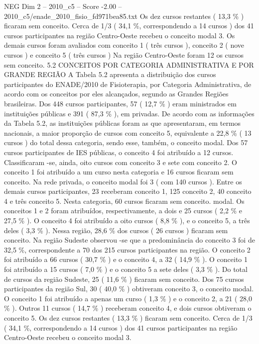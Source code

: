 \begin{textsample}{NEG Dim 2 – 2010\_c5 – Score -2.00 – 2010\_c5/enade\_2010\_fisio\_fd971bea85.txt}
Os dez cursos restantes ( 13,3 \% ) ficaram sem conceito.
Cerca de 1/3 ( 34,1 \%, correspondendo a 14 cursos ) dos 41 cursos participantes na região Centro-Oeste recebeu o conceito modal 3.
Os demais cursos foram avaliados com conceito 1 ( três cursos ), conceito 2 ( nove cursos ) e conceito 5 ( três cursos ) Na região Centro-Oeste foram 12 os cursos sem conceito. 5.2 CONCEITOS POR CATEGORIA ADMINISTRATIVA E POR GRANDE REGIÃO A Tabela 5.2 apresenta a distribuição dos cursos participantes do ENADE/2010 de Fisioterapia, por Categoria Administrativa, de acordo com os conceitos por eles alcançados, segundo as Grandes Regiões brasileiras.
Dos 448 cursos participantes, 57 ( 12,7 \% ) eram ministrados em instituições públicas e 391 ( 87,3 \% ), em privadas.
De acordo com as informações da Tabela 5.2, as instituições públicas foram as que apresentaram, em termos nacionais, a maior proporção de cursos com conceito 5, equivalente a 22,8 \% ( 13 cursos ) do total dessa categoria, sendo esse, também, o conceito modal.
Dos 57 cursos participantes de IES públicas, o conceito 4 foi atribuído a 12 cursos.
Classificaram -se, ainda, oito cursos com conceito 3 e sete com conceito 2.
O conceito 1 foi atribuído a um curso nesta categoria e 16 cursos ficaram sem conceito.
Na rede privada, o conceito modal foi 3 ( com 140 cursos ).
Entre os demais cursos participantes, 23 receberam conceito 1, 125 conceito 2, 40 conceito 4 e três conceito 5.
Nesta categoria, 60 cursos ficaram sem conceito. modal.
Os conceitos 1 e 2 foram atribuídos, respectivamente, a dois e 25 cursos ( 2,2 \% e 27,5 \% ).
O conceito 4 foi atribuído a oito cursos ( 8,8 \% ), e o conceito 5, a três deles ( 3,3 \% ).
Nessa região, 28,6 \% dos cursos ( 26 cursos ) ficaram sem conceito.
Na região Sudeste observou -se que a predominância do conceito 3 foi de 32,5 \%, correspondente a 70 dos 215 cursos participantes na região.
O conceito 2 foi atribuído a 66 cursos ( 30,7 \% ) e o conceito 4, a 32 ( 14,9 \% ).
O conceito 1 foi atribuído a 15 cursos ( 7,0 \% ) e o conceito 5 a sete deles ( 3,3 \% ).
Do total de cursos da região Sudeste, 25 ( 11,6 \% ) ficaram sem conceito.
Dos 75 cursos participantes da região Sul, 30 ( 40,0 \% ) obtiveram conceito 3, o conceito modal.
O conceito 1 foi atribuído a apenas um curso ( 1,3 \% ) e o conceito 2, a 21 ( 28,0 \% ).
Outros 11 cursos ( 14,7 \% ) receberam conceito 4, e dois cursos obtiveram o conceito 5.
Os dez cursos restantes ( 13,3 \% ) ficaram sem conceito.
Cerca de 1/3 ( 34,1 \%, correspondendo a 14 cursos ) dos 41 cursos participantes na região Centro-Oeste recebeu o conceito modal 3.

\end{textsample}
